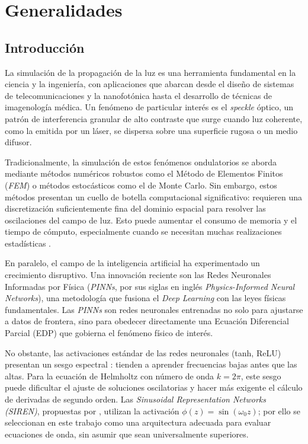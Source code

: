 \chapter{Generalidades}\label{cap1:generalidades}

\section{Introducción}

La simulación de la propagación de la luz es una herramienta fundamental en la
ciencia y la ingeniería, con aplicaciones que abarcan desde el diseño de sistemas
de telecomunicaciones y la nanofotónica hasta el desarrollo de técnicas de
imagenología médica. Un fenómeno de particular interés es el \textit{speckle}
óptico, un patrón de interferencia granular de alto contraste que surge cuando
luz coherente, como la emitida por un láser, se dispersa sobre una superficie
rugosa o un medio difusor.

Tradicionalmente, la simulación de estos fenómenos ondulatorios se aborda
mediante métodos numéricos robustos como el Método de Elementos Finitos
(\textit{FEM}) o métodos estocásticos como el de Monte Carlo. Sin embargo,
estos métodos presentan un cuello de botella computacional significativo:
requieren una discretización suficientemente fina del dominio espacial para
resolver las oscilaciones del campo de luz. Esto puede aumentar el consumo de
memoria y el tiempo de cómputo, especialmente cuando se necesitan muchas
realizaciones estadísticas
\parencite{jin2014finite, goodman2007speckle}.

En paralelo, el campo de la inteligencia artificial ha experimentado un
crecimiento disruptivo. Una innovación reciente son las Redes Neuronales
Informadas por Física (\textit{PINNs}, por sus siglas en inglés
\textit{Physics-Informed Neural Networks}), una metodología que fusiona el
\textit{Deep Learning} con las leyes físicas fundamentales. Las \textit{PINNs}
\parencite{raissi2019physics} son redes neuronales entrenadas no solo para
ajustarse a datos de frontera, sino para obedecer directamente una Ecuación
Diferencial Parcial (EDP) que gobierna el fenómeno físico de interés.

No obstante, las activaciones estándar de las redes neuronales (tanh, ReLU)
presentan un sesgo espectral \parencite{rahaman2019spectral}: tienden a aprender
frecuencias bajas antes que las altas. Para la ecuación de Helmholtz con número
de onda $k = 2\pi$, este sesgo puede dificultar el ajuste de soluciones
oscilatorias y hacer más exigente el cálculo de derivadas de segundo orden.
Las \textit{Sinusoidal Representation Networks (SIREN)}, propuestas por
\textcite{sitzmann2020siren}, utilizan la activación $\phi(z) = \sin(\omega_0 z)$;
por ello se seleccionan en este trabajo como una arquitectura adecuada para
evaluar ecuaciones de onda, sin asumir que sean universalmente superiores.

